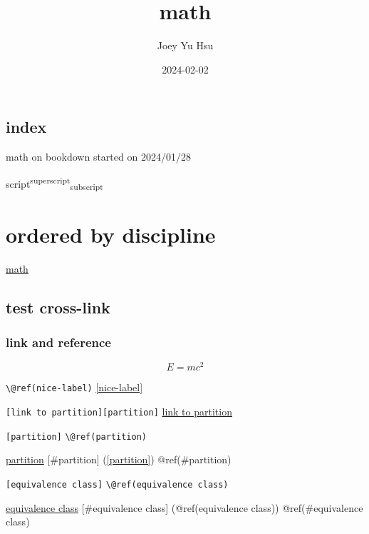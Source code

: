 \documentclass[
]{book}
\title{math}
\author{Joey Yu Hsu}
\date{2024-02-02}
\theoremstyle{definition}
\theoremstyle{definition}
\theoremstyle{definition}
\theoremstyle{definition}
\theoremstyle{remark}
\begin{document}
\maketitle

{
\hypersetup{linkcolor=}
\setcounter{tocdepth}{1}
\tableofcontents
}
\hypertarget{index}{%
\chapter*{index}\label{index}}

math on bookdown started on 2024/01/28

script\textsuperscript{superscript}\textsubscript{subscript}

\hypertarget{part-ordered-by-discipline}{%
\part{ordered by discipline}\label{part-ordered-by-discipline}}

\protect\hyperlink{nice-label}{math}

\hypertarget{test-cross-link}{%
\chapter{test cross-link}\label{test-cross-link}}

\hypertarget{link-and-reference}{%
\section{link and reference}\label{link-and-reference}}

\begin{equation}
  E=mc^2
  \label{eq:emc}
\end{equation}

\texttt{\textbackslash{}@ref(nice-label)} \ref{nice-label}

\texttt{{[}link\ to\ partition{]}{[}partition{]}} \protect\hyperlink{partition}{link to partition}

\texttt{{[}partition{]}} \texttt{\textbackslash{}@ref(partition)}

\protect\hyperlink{partition}{partition} {[}\#partition{]} (\ref{partition}) @ref(\#partition)

\texttt{{[}equivalence\ class{]}} \texttt{\textbackslash{}@ref(equivalence\ class)}

\protect\hyperlink{equivalence-class}{equivalence class} {[}\#equivalence class{]} (@ref(equivalence class)) @ref(\#equivalence class)
\end{document}
